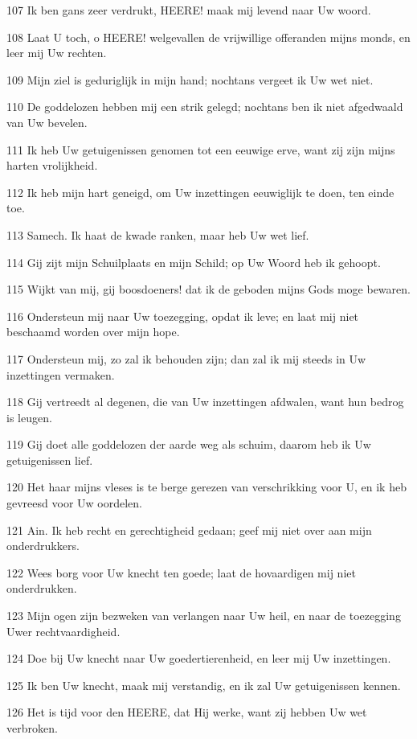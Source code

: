 \par 107 Ik ben gans zeer verdrukt, HEERE! maak mij levend naar Uw woord.
\par 108 Laat U toch, o HEERE! welgevallen de vrijwillige offeranden mijns monds, en leer mij Uw rechten.
\par 109 Mijn ziel is geduriglijk in mijn hand; nochtans vergeet ik Uw wet niet.
\par 110 De goddelozen hebben mij een strik gelegd; nochtans ben ik niet afgedwaald van Uw bevelen.
\par 111 Ik heb Uw getuigenissen genomen tot een eeuwige erve, want zij zijn mijns harten vrolijkheid.
\par 112 Ik heb mijn hart geneigd, om Uw inzettingen eeuwiglijk te doen, ten einde toe.
\par 113 Samech. Ik haat de kwade ranken, maar heb Uw wet lief.
\par 114 Gij zijt mijn Schuilplaats en mijn Schild; op Uw Woord heb ik gehoopt.
\par 115 Wijkt van mij, gij boosdoeners! dat ik de geboden mijns Gods moge bewaren.
\par 116 Ondersteun mij naar Uw toezegging, opdat ik leve; en laat mij niet beschaamd worden over mijn hope.
\par 117 Ondersteun mij, zo zal ik behouden zijn; dan zal ik mij steeds in Uw inzettingen vermaken.
\par 118 Gij vertreedt al degenen, die van Uw inzettingen afdwalen, want hun bedrog is leugen.
\par 119 Gij doet alle goddelozen der aarde weg als schuim, daarom heb ik Uw getuigenissen lief.
\par 120 Het haar mijns vleses is te berge gerezen van verschrikking voor U, en ik heb gevreesd voor Uw oordelen.
\par 121 Ain. Ik heb recht en gerechtigheid gedaan; geef mij niet over aan mijn onderdrukkers.
\par 122 Wees borg voor Uw knecht ten goede; laat de hovaardigen mij niet onderdrukken.
\par 123 Mijn ogen zijn bezweken van verlangen naar Uw heil, en naar de toezegging Uwer rechtvaardigheid.
\par 124 Doe bij Uw knecht naar Uw goedertierenheid, en leer mij Uw inzettingen.
\par 125 Ik ben Uw knecht, maak mij verstandig, en ik zal Uw getuigenissen kennen.
\par 126 Het is tijd voor den HEERE, dat Hij werke, want zij hebben Uw wet verbroken.
